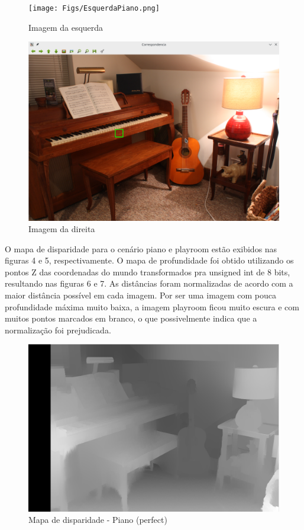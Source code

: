 \documentclass{bmvc2k}
\begin{document}
\begin{figure}[htbp]
  \centering
  \begin{minipage}[b]{0.44\textwidth}
    \texttt{[image: Figs/EsquerdaPiano.png]}
    \caption{Imagem da esquerda}
  \end{minipage}
  \hspace{2.4mm}
  \begin{minipage}[b]{0.44\textwidth}
    \includegraphics[width=\textwidth]{Figs/CorrespPiano.png}
    \caption{Imagem da direita}
  \end{minipage}
\end{figure}

O mapa de disparidade para o cenário piano e playroom estão exibidos nas figuras 4 e 5, respectivamente. O mapa de profundidade foi obtido utilizando os pontos Z das coordenadas do mundo transformados pra unsigned int de 8 bits, resultando nas figuras 6 e 7. As distâncias foram normalizadas de acordo com a maior distância possível em cada imagem. Por ser uma imagem com pouca profundidade máxima muito baixa, a imagem playroom ficou muito escura e com muitos pontos marcados em branco, o que possivelmente indica que a normaliza\c{c}ão foi prejudicada.

\begin{figure}[htbp]
            \centering
            \includegraphics[scale=0.3]{Figs/disppiano.png}
            \caption{Mapa de disparidade - Piano (perfect)}
            \label{1}
        \end{figure}
        
\end{document}
